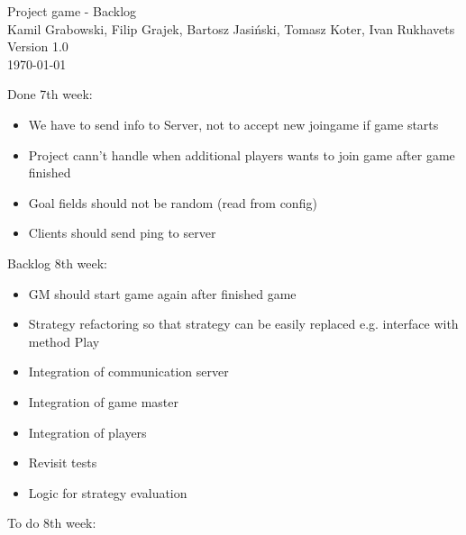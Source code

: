 \documentclass[11pt,a4paper]{article}
\begin{document}
\begin{titlepage}
\centering
\huge Project game - Backlog \\
\vspace{1.5cm}
\large Kamil Grabowski, Filip Grajek, Bartosz Jasiński, Tomasz Koter, Ivan Rukhavets \\
\vspace{1.0cm}
Version 1.0 \\
\vspace{1.0cm}
\today
\end{titlepage}

Done 7th week:
\begin{itemize}
\item We have to send info to Server, not to accept new joingame if game starts
\item Project cann't handle when additional players wants to join game after game finished
\item Goal fields should not be random (read from config)
\item Clients should send ping to server
\end{itemize}


Backlog 8th week:
\begin{itemize}
\item GM should start game again after finished game
\item Strategy refactoring so that strategy can be easily replaced e.g. interface with method Play
\item Integration of communication server
\item Integration of game master
\item Integration of players
\item Revisit tests
\item Logic for strategy evaluation 
\end{itemize}


To do 8th week:
\end{document}

